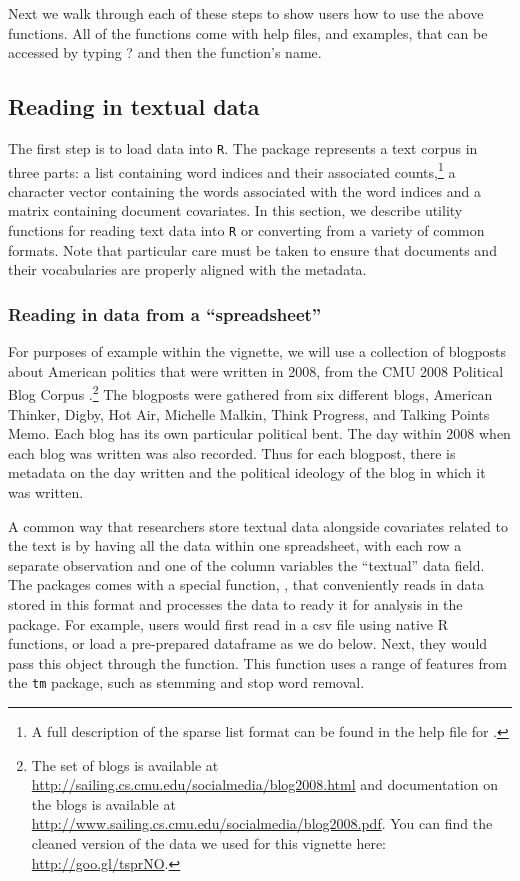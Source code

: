 \documentclass[nojss]{jss}
\begin{document}
Next we walk through each of these steps to show users how to use the above functions. All of the functions come with help files, and examples, that can be accessed by typing ? and then the function's name.

\subsection{Reading in textual data}

The first step is to load data into \texttt{R}. The  package represents a text corpus in three parts: a  list containing word indices and their associated counts,\footnote{A full description of the sparse list format can be found in the help file for .} a  character vector containing the words associated with the word indices and a  matrix containing document covariates. In this section, we describe utility functions for reading text data into \texttt{R} or converting from a variety of common formats. Note that particular care must be taken to ensure that documents and their vocabularies are properly aligned with the metadata.


\subsubsection{Reading in data from a ``spreadsheet''}

For purposes of example within the vignette, we will use a collection of blogposts about American politics that were written in 2008, from the CMU 2008 Political Blog Corpus \citep{poliblog}.\footnote{The set of blogs is available at \url{http://sailing.cs.cmu.edu/socialmedia/blog2008.html} and documentation on the blogs is available at \url{http://www.sailing.cs.cmu.edu/socialmedia/blog2008.pdf}.  You can find the cleaned version of the data we used for this vignette here: \url{http://goo.gl/tsprNO}.} The blogposts were gathered from six different blogs, American Thinker, Digby, Hot Air, Michelle Malkin, Think Progress, and Talking Points Memo.  Each blog has its own particular political bent.  The day within 2008 when each blog was written was also recorded.  Thus for each blogpost, there is metadata on the day written and the political ideology of the blog in which it was written.

A common way that researchers store textual data alongside covariates related to the text is by having all the data within one spreadsheet, with each row a separate observation and one of the column variables the ``textual'' data field. The  packages comes with a special function, , that conveniently reads in data stored in this format and processes the data to ready it for analysis in the  package.  For example, users would first read in a csv file using native R functions, or load a pre-prepared dataframe as we do below. Next, they would pass this object through the  function. This function uses a range of features from the \texttt{tm} package, such as stemming and stop word removal.
\end{document}
